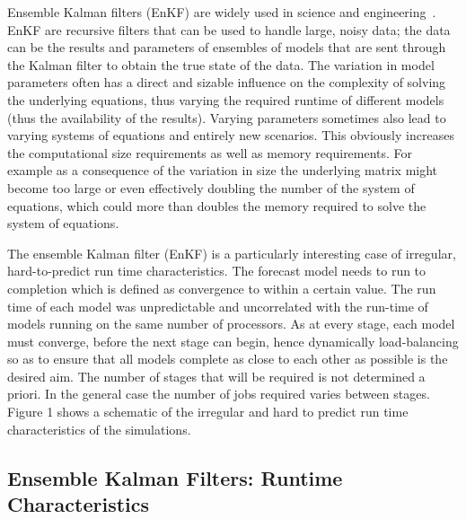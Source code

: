 \documentclass{sig-alternate}
\begin{document}
Ensemble Kalman filters (EnKF) are widely used in science and
engineering~\cite{DataAssim, KalmanPaper}. EnKF are recursive filters
that can be used to handle large, noisy data; the data can be the
results and parameters of ensembles of models that are sent through
the Kalman filter to obtain the true state of the data. The variation
in model parameters often has a direct and sizable influence on the
complexity of solving the underlying equations, thus varying the
required runtime of different models (thus the availability of the
results).  Varying parameters sometimes also lead to varying systems
of equations and entirely new scenarios. This obviously increases the
computational size requirements as well as memory requirements.  For
example as a consequence of the variation in size the underlying
matrix might become too large or even effectively doubling the number
of the system of equations, which could more than doubles the memory
required to solve the system of equations.

The ensemble Kalman filter (EnKF) is a particularly interesting case
of irregular, hard-to-predict run time characteristics.  The forecast
model needs to run to completion which is defined as convergence to
within a certain value.  The run time of each model was unpredictable
and uncorrelated with the run-time of models running on the same
number of processors.  As at every stage, each model must converge,
before the next stage can begin, hence dynamically load-balancing so
as to ensure that all models complete as close to each other as
possible is the desired aim.  The number of stages that will be
required is not determined a priori. In the general case the number of
jobs required varies between stages.  Figure 1 shows a schematic of
the irregular and hard to predict run time characteristics of the
simulations.

\subsection{Ensemble Kalman Filters: Runtime Characteristics}

\end{document}
